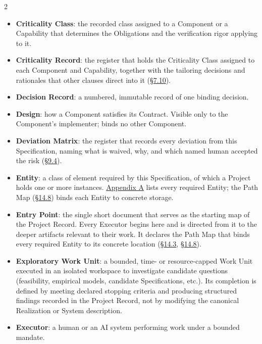 \begin{multicols}{2}
\begin{itemize}
\item \textbf{Criticality Class}: the recorded class assigned to a Component or a Capability that determines the Obligations and the verification rigor applying to it.

\item \textbf{Criticality Record}: the register that holds the Criticality Class assigned to each Component and Capability, together with the tailoring decisions and rationales that other clauses direct into it (\hyperlink{nss-7.10}{\S7.10}).

\item \textbf{Decision Record}: a numbered, immutable record of one binding decision.

\item \textbf{Design}: how a Component satisfies its Contract. Visible only to the Component’s implementer; binds no other Component.

\item \textbf{Deviation Matrix}: the register that records every deviation from this Specification, naming what is waived, why, and which named human accepted the risk (\hyperlink{nss-9.4}{\S9.4}).

\item \textbf{Entity}: a class of element required by this Specification, of which a Project holds one or more instances. \hyperlink{nss-appA}{Appendix A} lists every required Entity; the Path Map (\hyperlink{nss-14.8}{\S14.8}) binds each Entity to concrete storage.

\item \textbf{Entry Point}: the single short document that serves as the starting map of the Project Record. Every Executor begins here and is directed from it to the deeper artifacts relevant to their work. It declares the Path Map that binds every required Entity to its concrete location (\hyperlink{nss-14.3}{\S14.3}, \hyperlink{nss-14.8}{\S14.8}).

\item \textbf{Exploratory Work Unit}: a bounded, time- or resource-capped Work Unit executed in an isolated workspace to investigate candidate questions (feasibility, empirical models, candidate Specifications, etc.). Its completion is defined by meeting declared stopping criteria and producing structured findings recorded in the Project Record, not by modifying the canonical Realization or System description.

\item \textbf{Executor}: a human or an AI system performing work under a bounded mandate.


\end{itemize}
\end{multicols}
